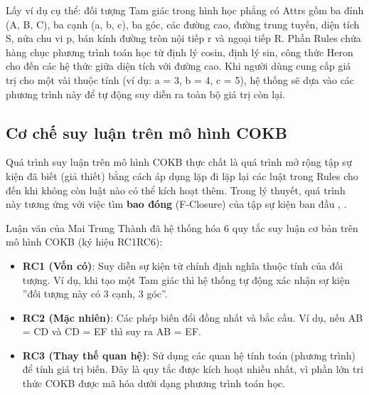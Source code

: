 \documentclass[13pt,a4paper,oneside]{extreport}
\begin{document}
Lấy ví dụ cụ thể: đối tượng Tam giác trong hình học phẳng có Attrs gồm ba đỉnh (A, B, C), ba cạnh (a, b, c), ba góc, các đường cao, đường trung tuyến, diện tích S, nửa chu vi p, bán kính đường tròn nội tiếp r và ngoại tiếp R. Phần Rules chứa hàng chục phương trình toán học  từ định lý cosin, định lý sin, công thức Heron cho đến các hệ thức giữa diện tích với đường cao. Khi người dùng cung cấp giá trị cho một vài thuộc tính (ví dụ: a = 3, b = 4, c = 5), hệ thống sẽ dựa vào các phương trình này để tự động suy diễn ra toàn bộ giá trị còn lại.


\subsection{Cơ chế suy luận trên mô hình COKB}


Quá trình suy luận trên mô hình COKB thực chất là quá trình mở rộng tập sự kiện đã biết (giả thiết) bằng cách áp dụng lặp đi lặp lại các luật trong Rules cho đến khi không còn luật nào có thể kích hoạt thêm. Trong lý thuyết, quá trình này tương ứng với việc tìm \textbf{bao đóng} (F-Closure) của tập sự kiện ban đầu \cite{Dvn_Ijcsi}, \cite{HIUJS_Article}.


Luận văn của Mai Trung Thành \cite{Dvn_Ijcsi} đã hệ thống hóa 6 quy tắc suy luận cơ bản trên mô hình COKB (ký hiệu RC1RC6):


\begin{itemize}
  \item \textbf{RC1 (Vốn có)}: Suy diễn sự kiện từ chính định nghĩa thuộc tính của đối tượng. Ví dụ, khi tạo một Tam giác thì hệ thống tự động xác nhận sự kiện ''đối tượng này có 3 cạnh, 3 góc''.
\end{itemize}



\begin{itemize}
  \item \textbf{RC2 (Mặc nhiên)}: Các phép biến đổi đồng nhất và bắc cầu. Ví dụ, nếu AB = CD và CD = EF thì suy ra AB = EF.
\end{itemize}



\begin{itemize}
  \item \textbf{RC3 (Thay thế quan hệ)}: Sử dụng các quan hệ tính toán (phương trình) để tính giá trị biến. Đây là quy tắc được kích hoạt nhiều nhất, vì phần lớn tri thức COKB được mã hóa dưới dạng phương trình toán học.
\end{itemize}
\end{document}
